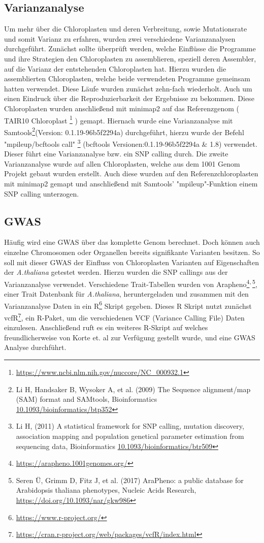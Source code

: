 \documentclass{scrartcl}
\begin{document}
\subsection{Varianzanalyse}
\label{sec-3-3}
Um mehr über die Chloroplasten und deren Verbreitung, sowie Mutationsrate und somit Varianz zu erfahren, wurden zwei verschiedene Varianzanalysen durchgeführt. 
Zunächst sollte überprüft werden, welche Einflüsse die Programme und ihre Strategien den Chloroplasten zu assemblieren, speziell deren Assembler, auf die Varianz der 
entstehenden Chloroplasten hat. Hierzu wurden die assemblierten Chloroplasten, welche beide verwendeten Programme gemeinsam hatten verwendet. Diese Läufe wurden zunächst
zehn-fach wiederholt. Auch um einen Eindruck über die Reproduzierbarkeit der Ergebnisse zu bekommen. Diese Chloroplasten wurden anschließend mit minimap2 \footnotemark[55]{} auf das 
Referenzgenom ( TAIR10 Chloroplast \footnote{\url{https://www.ncbi.nlm.nih.gov/nuccore/NC_000932.1}} ) gemapt. Hiernach wurde eine Varianzanalyse mit Samtools\footnote{Li H, Handsaker B, Wysoker A, et al. (2009) The Sequence alignment/map (SAM) format and SAMtools, Bioinformatics \url{10.1093/bioinformatics/btp352}}(Version: 0.1.19-96b5f2294a) durchgeführt, hierzu wurde der Befehl
"mpileup/bcftools call" \footnote{Li H, (2011) A statistical framework for SNP calling, mutation discovery, association mapping and population genetical parameter estimation from sequencing data, Bioinformatics  \url{10.1093/bioinformatics/btr509}} (bcftools Versionen:0.1.19-96b5f2294a \& 1.8) verwendet. Dieser führt eine Varianzanalyse bzw. ein SNP calling durch. Die zweite Varianzanalyse wurde auf allen Chloroplasten, welche aus dem
1001 Genom Projekt gebaut wurden erstellt. Auch diese wurden auf den Referenzchloroplasten mit minimap2 gemapt und anschließend mit Samtools' "mpileup"-Funktion einem
SNP calling unterzogen. 

\subsection{GWAS}
\label{sec-3-4}
Häufig wird eine GWAS über das komplette Genom berechnet. Doch können auch einzelne Chromosomen oder Organellen bereits signifikante Varianten besitzen. 
So soll mit dieser GWAS der Einfluss von Chloroplasten Varianten auf Eigenschaften der \emph{A.thaliana} getestet werden. Hierzu wurden die SNP callings aus der Varianzanalyse verwendet.
Verschiedene Trait-Tabellen wurden von Arapheno\footnote{\url{https://arapheno.1001genomes.org/}}\textsuperscript{,}\,\footnote{Seren Ü, Grimm D, Fitz J, et al. (2017) AraPheno: a public database for Arabidopsis thaliana phenotypes, Nucleic Acids Research, \url{https://doi.org/10.1093/nar/gkw986}}, einer Trait Datenbank für \emph{A.thaliana}, heruntergeladen und zusammen mit den Varianzanalyse Daten in ein R\footnote{\url{https://www.r-project.org/}} Skript gegeben.
Dieses R Skript nutzt zunächst vcfR\footnote{\url{https://cran.r-project.org/web/packages/vcfR/index.html}}, ein R-Paket, um die verschiedenen VCF (Variance Calling File) Daten einzulesen. Anschließend ruft es ein weiteres R-Skript auf welches
freundlicherweise von Korte et. al\footnotemark[48]{} zur Verfügung gestellt wurde, und eine GWAS Analyse durchführt.
\end{document}
